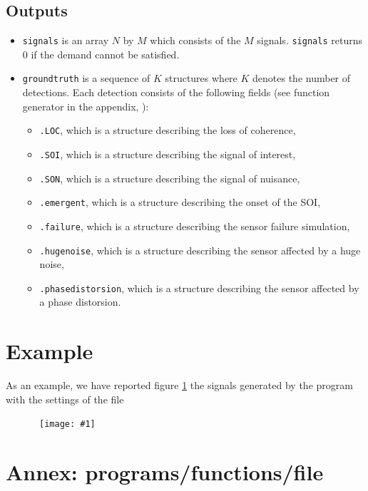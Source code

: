 \documentclass[a4paper, 10pt]{report}
\newcommand{\figscale}[4]{
\begin{figure}[hbtp]
\centerline{
    \hbox{ \texttt{[image: \#1]} }
}
\begin{center}
\parbox{12	 cm}
{
    \caption{\protect\small\it  {#2}}
    \label {#3}
}
\end{center}

\end{figure}}
\def\ttb{\tt\color{blue}}
\def\ttr{\tt\color{red}}
\begin{document}
\subsection {Outputs}
\begin{itemize}
\item
{\ttr signals} is an array $N$ by $M$ which consists of the $M$ signals. {\ttr signals} returns $0$ if the demand cannot be satisfied.
\item
{\ttr groundtruth} is a sequence of $K$ structures where $K$ denotes the number of detections. Each detection consists of the following fields (see function generator in the appendix, {\ttb {}}):
\begin{itemize}
\item
{\ttr .LOC}, which is a structure describing the loss of coherence,
\item
{\ttr .SOI}, which is a structure describing the signal of interest,
\item
{\ttr .SON}, which is a structure describing the signal of nuisance,
\item
{\ttr .emergent}, which is a structure describing the onset of the SOI,
\item
{\ttr .failure}, which is a structure describing the sensor failure simulation,
\item
{\ttr .hugenoise}, which is a structure describing the sensor affected by a huge noise,
\item
{\ttr .phasedistorsion}, which is a structure describing the sensor affected by a phase distorsion.

\end{itemize}
\end{itemize}


\newpage
\section{Example}

As an example, we have reported figure \ref{fig:example} the signals generated by the program {\ttb  {}} with the settings of the file {\ttb  {}}

\figscale{example.png}{}{fig:example}{1}


\newpage
\appendix
\def\progsdir {/Users/maurice/etudes/ctbto/allJOBs2016/myjob/PROGSPY/pierrick/testsIDC/}

\section{Annex: programs/functions/file}
\end{document}
